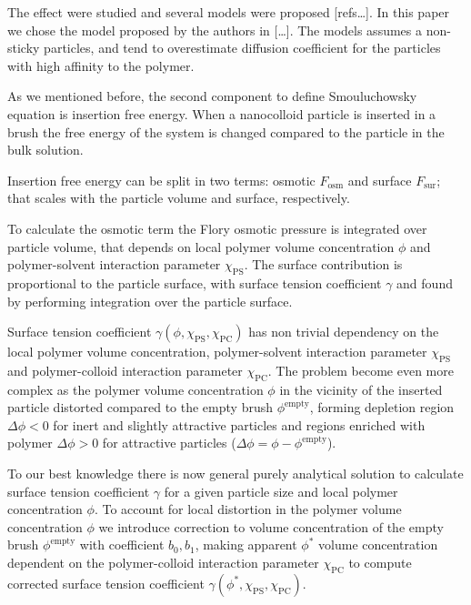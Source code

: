 \documentclass[12pt, a4paper]{article}
\begin{document}
The effect were studied and several models were proposed [refs\dots]. 
In this paper we chose the model proposed by the authors in [\dots].
The models assumes a non-sticky particles, and tend to overestimate diffusion coefficient for the particles with high affinity to the polymer.

As we mentioned before, the second component to define Smouluchowsky equation is insertion free energy. 
When a nanocolloid particle is inserted in a brush the free energy of the system is changed compared to the particle in the bulk solution. 

Insertion free energy can be split in two terms: osmotic $F_{\textrm{osm}}$ and surface $F_{\textrm{sur}}$; that scales with the particle volume and surface, respectively.

To calculate the osmotic term the Flory osmotic pressure is integrated over particle volume, that depends on local polymer volume concentration $\phi$ and polymer-solvent interaction parameter $\chi_{\textrm{PS}}$.
The surface contribution is proportional to the particle surface, with surface tension coefficient $\gamma$ and found by performing integration over the particle surface.

Surface tension coefficient $\gamma(\phi, \chi_{\textrm{PS}}, \chi_{\textrm{PC}})$ has non trivial dependency on the local polymer volume concentration, polymer-solvent interaction parameter $\chi_{\textrm{PS}}$ and polymer-colloid interaction parameter $\chi_{\textrm{PC}}$.
The problem become even more complex as the polymer volume concentration $\phi$ in the vicinity of the inserted particle distorted compared to the empty brush $\phi^{\textrm{empty}}$, forming depletion region $\Delta \phi <0$ for inert and slightly attractive particles and regions enriched with polymer $\Delta \phi >0$ for attractive particles ($\Delta \phi = \phi - \phi^{\textrm{empty}}$).

To our best knowledge there is now general purely analytical solution to calculate surface tension coefficient $\gamma$ for a given particle size and local polymer concentration $\phi$.
To account for local distortion in the polymer volume concentration $\phi$ we introduce correction to volume concentration of the empty brush $\phi^{\textrm{empty}}$ with coefficient $b_0, b_1$, making apparent $\phi^{\ast}$ volume concentration dependent on the polymer-colloid interaction parameter $\chi_{\textrm{PC}}$ to compute corrected surface tension coefficient $\gamma(\phi^{\ast},\chi_{\textrm{PS}}, \chi_{\textrm{PC}})$.
\end{document}
